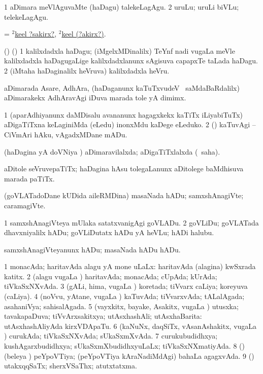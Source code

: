 \noindent
\gl{\akirx}
\bmng
\bnum
\num{1} aDimara meVlAguvaMte (haDagu) talekeLagAgu. 
\hypertarget{keelakirx(2)}{} 
\num{2} uruLu; uruLi biVLu; telekeLagAgu. 
\enum
\emng

\noindent
\gl{\pagu}
\bmng
{} = \hyperlink{keelsakirx(2)}{$^2$keel ?sakirx?}, \hyperlink{keelakirx(2)}{$^2$keel (?akirx?)}. 
\emng
\eentry

\bentry
{}
\gl{\nA}
\bmng
(\birx) (\ca) 
\bnum
\num{1} kalilxdadxla haDagu; (iMgelxMDinalilx) TeYnf nadi \mo vugaLa meVle kalilxdadxla haDagugaLige kalilxdadxlanunx sAgisuva capapxTe taLada haDagu. 
\num{2} (iMtaha haDaginalilx heVruva) kalilxdadxla heVru. 
\enum
\emng
\eentry

\bentry
{}
\gl{\nA}
\bmng
aDimarada Asare, AdhAra, (haDaganunx kaTuTxvudeV \mo\ saMdaBaRdalilx) aDimarakekx AdhAravAgi iDuva marada tole yA dimimx. 
\emng
\eentry

\bentry
{}
\gl{\sakirx}
\bmng
\bnum
\num{1} (aparAdhiyanunx daMDisalu avananunx hagagxkekx kaTiTx iLiyabiTuTx) aDigaTiTxna keLaginiMda (eLedu) inonxMdu kaDege eLeduko. 
\num{2} (\rUpa) kaTuvAgi -- CiVmAri hAku, vAgadxMDane mADu. 
\enum
\emng
\eentry

\bentry
{}
\gl{\gu}
\bmng
(haDagina yA doVNiya \vi) aDimaravilalxda; aDigaTiTxlalxda (\rUpa\ saha). 
\emng
\eentry

\bentry
{}
\gl{\nA}
\bmng
aDitole seVruvepaTiTx; haDagina hAsu tolegaLanunx aDitolege baMdhisuva marada paTiTx. 
\emng
\eentry

\bentry
{}
\gl{\nA}
\bmng
(goVLATadoDane kUDida aileRMDina) masaNada hADu; samxshAnagiVte; caramagiVte. 
\emng
\eentry

\bentry
{}
\gl{\sakirx}
\bmng
\bnum
\num{1} samxshAnagiVteya mUlaka satatxvanigAgi goVLADu. 
\num{2} goVLiDu; goVLATada dhavxniyalilx hADu; goVLiDutatx hADu yA heVLu; hADi halubu. 
\enum
\emng

\noindent
\gl{\akirx}
\bmng
samxshAnagiVteyanunx hADu; masaNada hADu hADu. 
\emng
\eentry

\bentry
{}
\gl{\gu}
\bmng
\bnum
\num{1} monacAda; haritavAda alagu yA mone uLaLx:  haritavAda (alagina) kwSxrada katitx. 
\num{2} (alagu \mo vugaLa \vi) haritavAda; monacAda; cUpAda; kUrAda; tiVkaSxNXvAda. 
\num{3} (gALi, hima, \mo vugaLa \vi) koretada; tiVvarx caLiya; koreyuva (caLiya). 
\num{4} (noVvu, yAtane, \mo vugaLa \vi) kaTuvAda; tiVvarxvAda; tALalAgada; asahaniVya; sahisalAgada. 
\num{5} (vayxkitx, bayake, Asakitx, \mo vugaLa \vi) utusxka; tavakapaDuva; tiVvArxsakitxya; utAsxhashAli; utAsxhaBarita:  utAsxhashAliyAda kirxVDApaTu. 
\num{6} (kaNuNx, daqSiTx, vAsanAshakitx, \mo vugaLa \vi) curukAda; tiVkaSxNXvAda; sUkaSxmXvAda. 
\num{7} curukubudidhxya; kushAgarxbudidhxya; sUkaSxmXbudidhxyuLaLx; tiVkaSxNXmatiyAda. 
\num{8} (\birx) (beleya \vi) peYpoVTiya; (peYpoVTiya kAraNadiMdAgi) bahaLa agagxvAda. 
\num{9} (\AmA) utakxqqSaTx; sherxVSaThx; atutxtatxma. 
\enum
\emng

